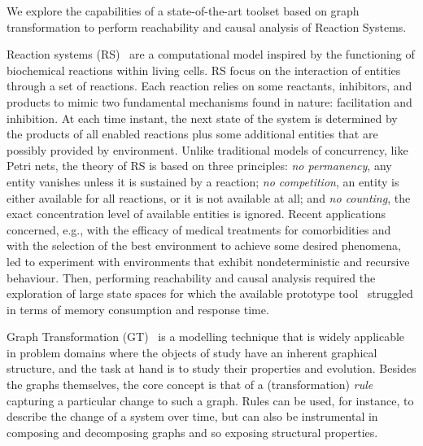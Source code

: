 \documentclass[sn-mathphys-num,a4paper,iicol,lineno,pdflatex]{sn-jnl-hacked}
\theoremstyle{thmstyleone}%
\theoremstyle{thmstyletwo}%
\theoremstyle{thmstylethree}%
\begin{document}
We explore the capabilities of  a state-of-the-art toolset based on graph transformation  to perform reachability and causal analysis of Reaction Systems.

Reaction systems (RS)~\cite{DBLP:journals/fuin/EhrenfeuchtR07} are a computational model inspired by the functioning of biochemical reactions within living cells. 
RS focus on the interaction of entities through a set of reactions. 
Each reaction relies on some reactants, inhibitors, and products to mimic two fundamental mechanisms found in nature: facilitation and inhibition.
At each time instant, the next state of the system is determined by the products of all enabled reactions plus some additional entities that are possibly provided by environment.
Unlike traditional models of concurrency, like Petri nets, the theory of RS is based on three principles: \emph{no permanency}, any entity vanishes unless it is sustained by a reaction; \emph{no competition}, an entity is either available for all reactions, or it is not available at all; and \emph{no counting}, the exact concentration level of available entities is ignored.
Recent applications concerned, e.g., with the efficacy of medical treatments for comorbidities and with the selection of the best environment to achieve some desired phenomena, led to experiment with environments that exhibit nondeterministic and recursive behaviour.
Then, performing reachability and causal analysis required the exploration of large state spaces for which the available prototype tool~\cite{DBLP:journals/tcs/BrodoBF21} struggled in terms of  memory consumption and response time.
 
Graph Transformation (GT)~\cite{DBLP:series/eatcs/EhrigEPT06,DBLP:books/sp/HeckelT20} is a modelling technique that is widely applicable in problem domains where the objects of study have an inherent graphical structure, and the task at hand is to study their properties and evolution. Besides the graphs themselves, the core concept is that of a (transformation) \emph{rule} capturing a particular change to such a graph. Rules can be used, for instance, to describe the change of a system over time, but can also be instrumental in composing and decomposing graphs and so exposing structural properties.
\end{document}
